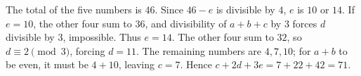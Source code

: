 The total of the five numbers is $46$. Since $46-e$ is divisible by $4$, $e$ is $10$ or $14$. If $e=10$, the other four sum to $36$, and divisibility of $a+b+c$ by $3$ forces $d$ divisible by $3$, impossible. Thus $e=14$. The other four sum to $32$, so $d\equiv2\pmod3$, forcing $d=11$. The remaining numbers are $4,7,10$; for $a+b$ to be even, it must be $4+10$, leaving $c=7$. Hence $c+2d+3e=7+22+42=\boxed{71}$.
